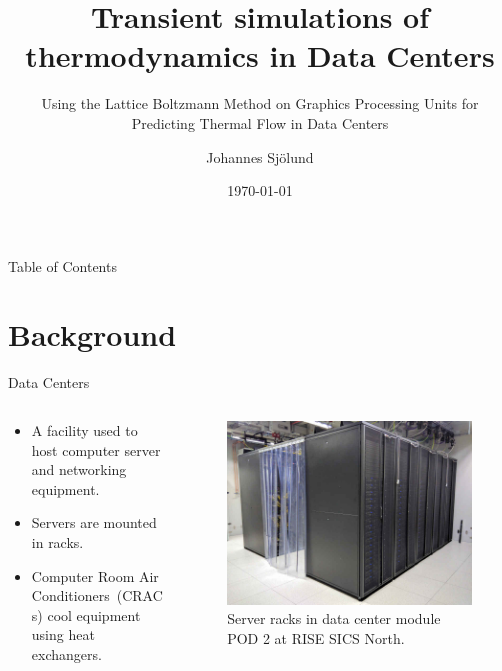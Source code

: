 \documentclass{beamer}
\title[Transient simulations of thermodynamics in Data Centers]{Transient simulations of thermodynamics in Data Centers}
\subtitle{\scriptsize Using the Lattice Boltzmann Method on Graphics Processing Units
for Predicting Thermal Flow in Data Centers}
\author[]{Johannes Sjölund}
\institute{}
\date{\today}
\begin{document}
\begin{frame}
  \titlepage
\end{frame}

\begin{frame}{Table of Contents}
\tableofcontents
\end{frame}

\section{Background}
\begin{frame}{Data Centers}
\begin{columns}[T]%
\begin{column}{.6\textwidth}
\begin{itemize}
\item A facility used to host computer server and networking equipment.
\item Servers are mounted in racks.
\item Computer Room Air Conditioners~(CRACs) cool equipment using heat exchangers.
\end{itemize}
\end{column}%
\hfill%
\begin{column}{.6\textwidth}
\begin{figure}[!htb]
\centering
\begin{tiny}%
\includegraphics[width=1.0\linewidth]{pod2_interior.jpg}
\end{tiny}
\caption{Server racks in data center module POD 2 at RISE SICS North.}
\end{figure}
\end{column}%
\end{columns}
\end{frame}
\end{document}
